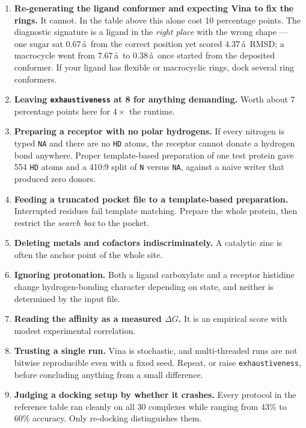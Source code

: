 \documentclass[11pt,a4paper]{article}
\newcommand{\code}[1]{\texttt{#1}}
\newcommand{\pitfall}[1]{\textcolor{warn}{\textbf{#1}}}
\begin{document}
\begin{enumerate}[leftmargin=1.4em, itemsep=6pt]

\item \pitfall{Re-generating the ligand conformer and expecting Vina to fix the
rings.} It cannot. In the table above this alone cost 10 percentage points. The
diagnostic signature is a ligand in the \emph{right place} with the wrong shape ---
one sugar sat $0.67$\,\aa\ from the correct position yet scored $4.37$\,\aa\ RMSD;
a macrocycle went from $7.67$\,\aa\ to $0.38$\,\aa\ once started from the deposited
conformer. If your ligand has flexible or macrocyclic rings, dock several ring
conformers.

\item \pitfall{Leaving \code{exhaustiveness} at 8 for anything demanding.} Worth
about 7 percentage points here for $4\times$ the runtime.

\item \pitfall{Preparing a receptor with no polar hydrogens.} If every nitrogen is
typed \code{NA} and there are no \code{HD} atoms, the receptor cannot donate a
hydrogen bond anywhere. Proper template-based preparation of one test protein gave
554 \code{HD} atoms and a 410:9 split of \code{N} versus \code{NA}, against a naive
writer that produced zero donors.

\item \pitfall{Feeding a truncated pocket file to a template-based preparation.}
Interrupted residues fail template matching. Prepare the whole protein, then
restrict the \emph{search box} to the pocket.

\item \pitfall{Deleting metals and cofactors indiscriminately.} A catalytic zinc is
often the anchor point of the whole site.

\item \pitfall{Ignoring protonation.} Both a ligand carboxylate and a receptor
histidine change hydrogen-bonding character depending on state, and neither is
determined by the input file.

\item \pitfall{Reading the affinity as a measured $\Delta G$.} It is an empirical
score with modest experimental correlation.

\item \pitfall{Trusting a single run.} Vina is stochastic, and multi-threaded runs
are not bitwise reproducible even with a fixed seed. Repeat, or raise
\code{exhaustiveness}, before concluding anything from a small difference.

\item \pitfall{Judging a docking setup by whether it crashes.} Every protocol in the
reference table ran cleanly on all 30 complexes while ranging from 43\% to 60\%
accuracy. Only re-docking distinguishes them.

\end{enumerate}
\end{document}

